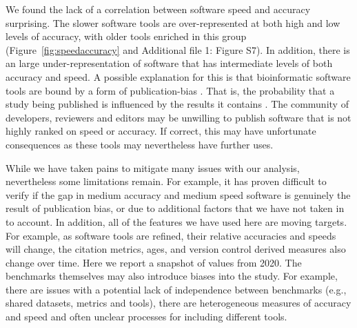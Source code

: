 \documentclass{bmcart}
\begin{document}
We found the lack of a correlation between software speed and accuracy
surprising.  The slower software tools are over-represented at both
high and low levels of accuracy{\color{red}, with older tools enriched in this group} (Figure~\ref{fig:speedaccuracy} {\color{red}and Additional file 1: Figure S7}).
In addition, there is an large under-representation of software that has
intermediate levels of both accuracy and speed. A possible explanation
for this is that bioinformatic software tools are bound by a form of
publication-bias \cite{Boulesteix2015-am,Nissen:2016}. That is, the
probability that a study being published is influenced by the results
it contains \cite{sterling1995publication}. The community of
developers, reviewers and editors may be unwilling to publish software
that is not highly ranked on speed or accuracy. If correct, this may
have unfortunate consequences as these tools may {\color{red}nevertheless} have further uses.







While we have taken pains to mitigate many issues with our analysis, nevertheless 
some limitations remain. For example, it has proven difficult to verify if the gap in medium accuracy 
and medium speed software is genuinely the result of publication bias, or due to additional factors that we have 
not taken in to account. In addition, all of the features we have used here are moving targets. For example, as software 
tools are refined, their relative accuracies and speeds will change, the citation metrics, ages, and version control 
derived measures also change over time. Here we report a snapshot of values from 2020.  The benchmarks themselves may 
also introduce biases into the study. For example, there are issues with a potential lack of independence between benchmarks 
(e.g., shared datasets, metrics and tools), there are heterogeneous measures of accuracy and speed and often unclear 
processes for including different tools. 
\end{document}
